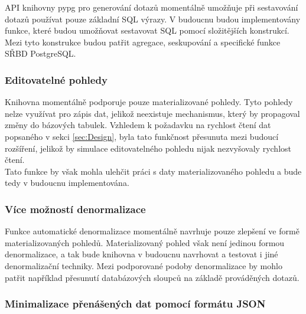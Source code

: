 \documentclass[ing,male,java,dept456]{diploma}						%
\begin{document}
API knihovny pypg pro generování dotazů momentálně umožňuje při sestavování dotazů používat pouze základní SQL výrazy. V budoucnu budou implementovány funkce, které budou umožňovat sestavovat SQL pomocí složitějších konstrukcí. Mezi tyto konstrukce budou patřit agregace, seskupování a specifické funkce SŘBD PostgreSQL.

\subsubsection{Editovatelné pohledy}
\label{subsubsec:EditView}

Knihovna momentálně podporuje pouze materializované pohledy. Tyto pohledy nelze využívat pro zápis dat, jelikož neexistuje mechanismus, který by propagoval změny do bázových tabulek. Vzhledem k požadavku na rychlost čtení dat popsaného v sekci \ref{sec:Design}, byla tato funkčnost přesunuta mezi budoucí rozšíření, jelikož by simulace editovatelného pohledu nijak nezvyšovaly rychlost čtení. \\
Tato funkce by však mohla ulehčit práci s daty materializovaného pohledu a bude tedy v budoucnu implementována.

\subsubsection{Více možností denormalizace}

Funkce automatické denormalizace momentálně navrhuje pouze zlepšení ve formě materializovaných pohledů. Materializovaný pohled však není jedinou formou denormalizace, a tak bude knihovna v budoucnu navrhovat a testovat i jiné denormalizační techniky. Mezi podporované podoby denormalizace by mohlo patřit například přesunutí databázových sloupců na základě prováděných dotazů.

\subsubsection{Minimalizace přenášených dat pomocí formátu JSON}
\end{document}
